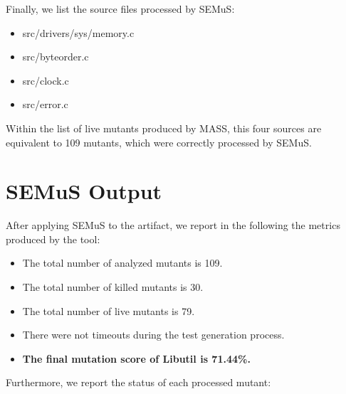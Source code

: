 Finally, we list the source files processed by SEMuS:

\begin{itemize}
\item src/drivers/sys/memory.c
\item src/byteorder.c
\item src/clock.c
\item src/error.c
\end{itemize}

Within the list of live mutants produced by MASS, this four sources are equivalent to 109 mutants, which were correctly processed by SEMuS.

\section{SEMuS Output}

After applying SEMuS to the artifact, we report in the following the metrics produced by the tool:

\begin{itemize}
	\item The total number of analyzed mutants is 109.
	\item The total number of killed mutants is 30.
	\item The total number of live mutants is 79.
	\item There were not timeouts during the test generation process.
	\item \textbf{The final mutation score of Libutil is 71.44\%.}
\end{itemize}


Furthermore, we report the status of each processed mutant:

